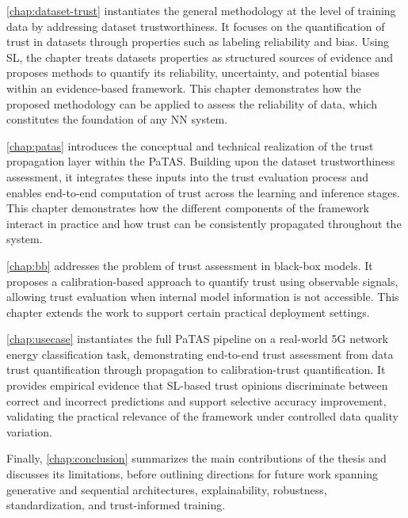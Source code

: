 \cref{chap:dataset-trust} instantiates the general methodology at the level of training data by addressing dataset trustworthiness. It focuses on the quantification of trust in datasets through properties such as labeling reliability and bias. Using \ac{SL}, the chapter treats datasets properties as structured sources of evidence and proposes methods to quantify its reliability, uncertainty, and potential biases
within an evidence-based framework. This chapter demonstrates how the proposed methodology can be applied to assess the reliability of data, which constitutes the foundation of any \ac{NN} system.

\cref{chap:patas} introduces the conceptual and technical realization of the trust propagation layer within the \ac{PaTAS}. Building upon the dataset trustworthiness assessment, it integrates these inputs into the trust evaluation process and enables end-to-end computation of trust across the learning and inference stages. This chapter demonstrates how the different components of the framework interact in practice and how trust can be consistently propagated throughout the system.

\cref{chap:bb} addresses the problem of trust assessment in black-box models. It proposes a calibration-based approach to quantify trust using observable signals, allowing trust evaluation when internal model information is not accessible. This chapter extends the work to support certain practical deployment settings.

\cref{chap:usecase} instantiates the full \ac{PaTAS} pipeline on a real-world 5G network energy classification task, demonstrating end-to-end trust assessment from data trust quantification through propagation to calibration-trust quantification. It provides empirical evidence that \ac{SL}-based trust opinions discriminate between correct and incorrect predictions and support selective accuracy improvement, validating the practical relevance of the framework under controlled data quality variation.

Finally, \cref{chap:conclusion} summarizes the main contributions of the thesis and discusses its limitations, before outlining directions for future work spanning generative and sequential architectures, explainability, robustness, standardization, and trust-informed training.












